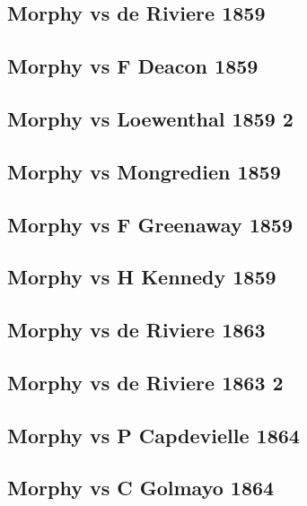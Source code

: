 \documentclass[]{book}
\begin{document}
\subsection{Morphy vs de Riviere
1859}\label{morphy-vs-de-riviere-1859-1}

\subsection{Morphy vs F Deacon 1859}\label{morphy-vs-f-deacon-1859}

\subsection{Morphy vs Loewenthal 1859
2}\label{morphy-vs-loewenthal-1859-2}

\subsection{Morphy vs Mongredien 1859}\label{morphy-vs-mongredien-1859}

\subsection{Morphy vs F Greenaway
1859}\label{morphy-vs-f-greenaway-1859}

\subsection{Morphy vs H Kennedy 1859}\label{morphy-vs-h-kennedy-1859}

\subsection{Morphy vs de Riviere 1863}\label{morphy-vs-de-riviere-1863}

\subsection{Morphy vs de Riviere 1863
2}\label{morphy-vs-de-riviere-1863-2}

\subsection{Morphy vs P Capdevielle
1864}\label{morphy-vs-p-capdevielle-1864}

\subsection{Morphy vs C Golmayo 1864}\label{morphy-vs-c-golmayo-1864}


\end{document}
